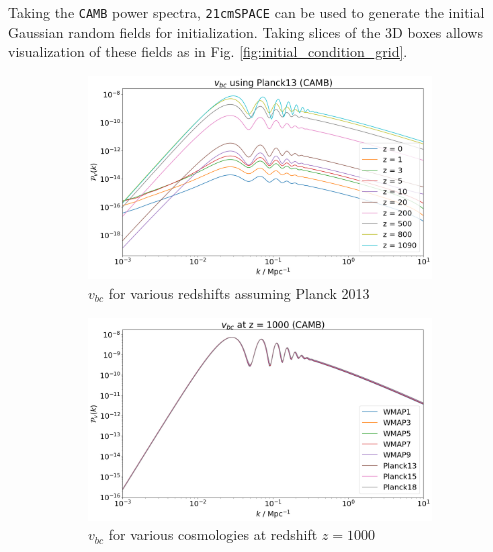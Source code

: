 \documentclass[floats,floatfix,showpacs,amssymb,prd,superscriptaddress,nofootinbib]{revtex4-2} %
\newcommand{\code}{\texttt}
\begin{document}
Taking the \code{CAMB} power spectra, \code{21cmSPACE} can be used to generate the initial Gaussian random fields for initialization. Taking slices of the 3D boxes allows visualization of these fields as in Fig. \ref{fig:initial_condition_grid}.

\begin{figure}[!htbp]
     \centering
     \begin{subfigure}{0.45\textwidth}
         \centering
         \includegraphics[width=\textwidth]{images/vbc_varied_redshift.png}
         \caption{$v_{bc}$ for various redshifts assuming Planck 2013}
         \label{fig:vbc_varied_redshift}
     \end{subfigure}
     \hfill
     \begin{subfigure}{0.45\textwidth}
         \centering
         \includegraphics[width=\textwidth]{images/vbc_varied_cosmology.png}
         \caption{$v_{bc}$ for various cosmologies at redshift $z = 1000$}
         \label{fig:vbc_varied_cosmology}
     \end{subfigure}
     \centering
     \begin{subfigure}{0.45\textwidth}

\end{subfigure}
\end{figure}
\end{document}
